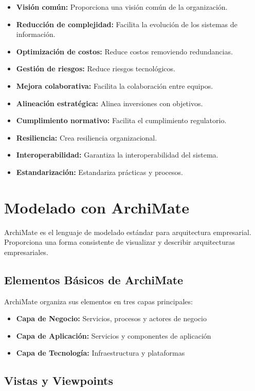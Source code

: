 \begin{itemize}
\item \textbf{Visión común:} Proporciona una visión común de la organización.
\item \textbf{Reducción de complejidad:} Facilita la evolución de los sistemas de información.
\item \textbf{Optimización de costos:} Reduce costos removiendo redundancias.
\item \textbf{Gestión de riesgos:} Reduce riesgos tecnológicos.
\item \textbf{Mejora colaborativa:} Facilita la colaboración entre equipos.
\item \textbf{Alineación estratégica:} Alinea inversiones con objetivos.
\item \textbf{Cumplimiento normativo:} Facilita el cumplimiento regulatorio.
\item \textbf{Resiliencia:} Crea resiliencia organizacional.
\item \textbf{Interoperabilidad:} Garantiza la interoperabilidad del sistema.
\item \textbf{Estandarización:} Estandariza prácticas y procesos.
\end{itemize}



\section{Modelado con ArchiMate}

ArchiMate es el lenguaje de modelado estándar para arquitectura empresarial. Proporciona una forma consistente de visualizar y describir arquitecturas empresariales.

\subsection{Elementos Básicos de ArchiMate}

ArchiMate organiza sus elementos en tres capas principales:
\begin{itemize}
\item \textbf{Capa de Negocio:} Servicios, procesos y actores de negocio
\item \textbf{Capa de Aplicación:} Servicios y componentes de aplicación
\item \textbf{Capa de Tecnología:} Infraestructura y plataformas
\end{itemize}

\subsection{Vistas y Viewpoints}

